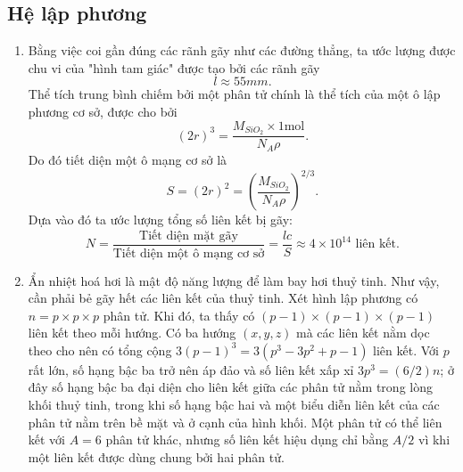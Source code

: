 \subsection*{Hệ lập phương}
\begin{enumerate}[label=(\alph*)]
    \item Bằng việc coi gần đúng các rãnh gãy như các đường thẳng, ta ước lượng được chu vi của "hình tam giác" được tạo bởi các rãnh gãy \begin{equation}l\approx 55mm.\end{equation}
    Thể tích trung bình chiếm bởi một phân tử chính là thể tích của một ô lập phương cơ sở, được cho bởi \begin{equation}(2r)^3=\frac{M_{SiO_2}\times1\text{mol}}{N_A\rho}.\end{equation} Do đó tiết diện một ô mạng cơ sở là \begin{equation}S=(2r)^2=\left(\frac{M_{SiO_2}}{N_A\rho}\right)^{2/3}.\end{equation}
    Dựa vào đó ta ước lượng tổng số liên kết bị gãy: \begin{equation}N=\frac{\text{Tiết diện mặt gãy}}{\text{Tiết diện một ô mạng cơ sở}}=\frac{lc}{S}\approx 4\times 10^{14}\text{~liên kết}. \end{equation}
    \item Ẩn nhiệt hoá hơi là mật độ năng lượng để làm bay hơi thuỷ tinh. Như vậy, cần phải bẻ gãy hết các liên kết của thuỷ tinh. Xét hình lập phương có $n=p\times p\times p$ phân tử. Khi đó, ta thấy có $(p-1)\times(p-1)\times(p-1)$ liên kết theo mỗi hướng. Có ba hướng $(x,y,z)$ mà các liên kết nằm dọc theo cho nên có tổng cộng $3(p-1)^3=3(p^3-3p^2+p-1)$ liên kết. Với $p$ rất lớn, số hạng bậc ba trở nên áp đảo và  số liên kết xấp xỉ $3p^3=(6/2)n$; ở đây số hạng bậc ba đại diện cho liên kết giữa các phân tử nằm trong lòng khối thuỷ tinh, trong khi số hạng bậc hai và một biểu diễn liên kết của các phân tử nằm trên bề mặt và ở cạnh của hình khối. Một phân tử có thể liên kết với $A=6$ phân tử khác, nhưng số liên kết hiệu dụng chỉ bằng $A/2$ vì khi một liên kết được dùng chung bởi hai phân tử. \newline

\end{enumerate}
